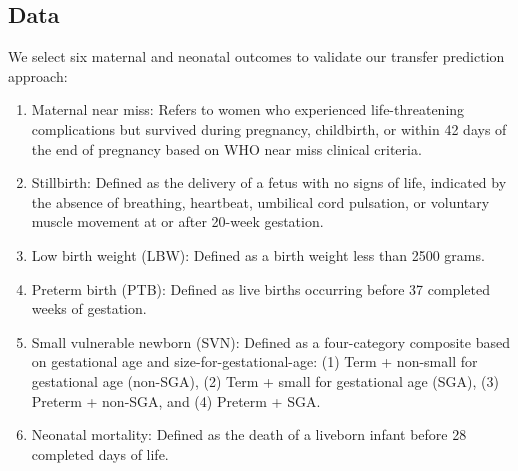 \documentclass[fleqn,10pt]{wlscirep}
\begin{document}
\subsection*{Data}
We select six maternal and neonatal outcomes to validate our transfer prediction approach: \begin{enumerate}
  \item Maternal near miss: Refers to women who experienced life-threatening complications but survived during pregnancy, childbirth, or within 42 days of the end of pregnancy based on WHO near miss clinical criteria.
  
  \item Stillbirth: Defined as the delivery of a fetus with no signs of life, indicated by the absence of breathing, heartbeat, umbilical cord pulsation, or voluntary muscle movement at or after 20-week gestation.
  
  \item Low birth weight (LBW): Defined as a birth weight less than 2500 grams.
  
  \item Preterm birth (PTB): Defined as live births occurring before 37 completed weeks of gestation.
  
  \item Small vulnerable newborn (SVN): Defined as a four-category composite based on gestational age and size-for-gestational-age: (1) Term + non-small for gestational age (non-SGA), (2) Term + small for gestational age (SGA), (3) Preterm + non-SGA, and (4) Preterm + SGA.
  
  \item Neonatal mortality: Defined as the death of a liveborn infant before 28 completed days of life.
\end{enumerate}
\end{document}
